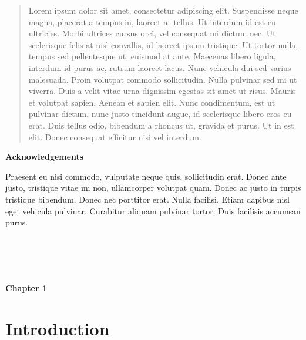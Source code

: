 \documentclass[12pt]{article}  %
\theoremstyle{plain}
\begin{document}
\newpage

\begin{abstract}

\noindent Lorem ipsum dolor sit amet, consectetur adipiscing elit. Suspendisse neque magna, placerat a tempus in, laoreet at tellus. Ut interdum id est eu ultricies. Morbi ultrices cursus orci, vel consequat mi dictum nec. Ut scelerisque felis at nisl convallis, id laoreet ipsum tristique. Ut tortor nulla, tempus sed pellentesque ut, euismod at ante. Maecenas libero ligula, interdum id purus ac, rutrum laoreet lacus. Nunc vehicula dui sed varius malesuada. Proin volutpat commodo sollicitudin. Nulla pulvinar sed mi ut viverra. Duis a velit vitae urna dignissim egestas sit amet ut risus. Mauris et volutpat sapien. Aenean et sapien elit. Nunc condimentum, est ut pulvinar dictum, nunc justo tincidunt augue, id scelerisque libero eros eu erat. Duis tellus odio, bibendum a rhoncus ut, gravida et purus. Ut in est elit. Donec consequat efficitur nisi vel interdum. \\

\end{abstract}
\newpage  %

\begin{center}
\textbf{Acknowledgements}  %
\end{center}
{\small

\noindent Praesent eu nisi commodo, vulputate neque quis, sollicitudin erat. Donec ante justo, tristique vitae mi non, ullamcorper volutpat quam. Donec ac justo in turpis tristique bibendum. Donec nec porttitor erat. Nulla facilisi. Etiam dapibus nisl eget vehicula pulvinar. Curabitur aliquam pulvinar tortor. Duis facilisis accumsan purus.
\\

}
\newpage


\tableofcontents  %
\newpage
\listoftables  %
\newpage
\listoffigures  %
\newpage

\noindent
\\\\\\\\
{\LARGE \bf Chapter 1}
\section{Introduction}
\end{document}
